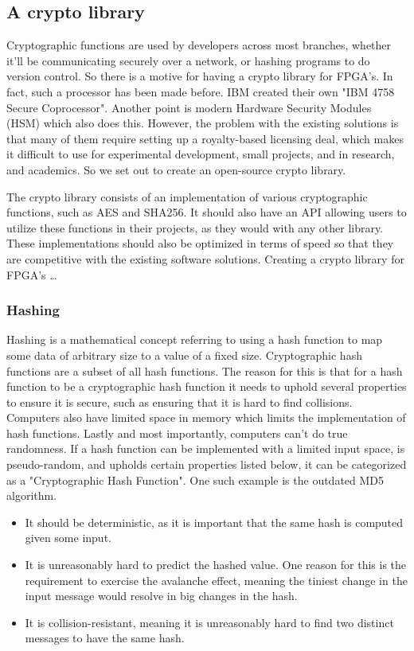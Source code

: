 \documentclass[a4paper]{article}
\begin{document}
\subsection{A crypto library}
\label{sec:org27c4069}
Cryptographic functions are used by developers across most branches, whether it'll be communicating securely over a network, or hashing programs to do version control.
So there is a motive for having a crypto library for FPGA's. In fact, such a processor has been made before. IBM created their own "IBM 4758 Secure Coprocessor"\cite{IBM4758}. Another point is modern Hardware Security Modules (HSM) which also does this.
However, the problem with the existing solutions is that many of them require setting up a royalty-based licensing deal, which makes it difficult to use for experimental development, small projects, and in research, and academics.
So we set out to create an open-source crypto library.

The crypto library consists of an implementation of various cryptographic functions, such as AES and SHA256. It should also have an API allowing users to utilize these functions in their projects, as they would with any other library.
These implementations should also be optimized in terms of speed so that they are competitive with the existing software solutions.
Creating a crypto library for FPGA's \ldots{}
\subsubsection{Hashing}
\label{sec:org7e21a9f}
Hashing is a mathematical concept referring to using a hash function to map some data of arbitrary size to a value of a fixed size. Cryptographic hash functions are a subset of all hash functions.
The reason for this is that for a hash function to be a cryptographic hash function it needs to uphold several properties to ensure it is secure, such as ensuring that it is hard to find collisions. Computers also have limited space in memory which limits the implementation of hash functions. Lastly and most importantly, computers can't do true randomness.
If a hash function can be implemented with a limited input space, is pseudo-random, and upholds certain properties listed below, it can be categorized as a "Cryptographic Hash Function". One such example is the outdated MD5 algorithm.
\begin{itemize}
\item It should be deterministic, as it is important that the same hash is computed given some input.
\item It is unreasonably hard to predict the hashed value. One reason for this is the requirement to exercise the avalanche effect, meaning the tiniest change in the input message would resolve in big changes in the hash.
\item It is collision-resistant, meaning it is unreasonably hard to find two distinct messages to have the same hash.
\end{itemize}
\end{document}
